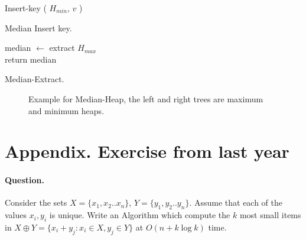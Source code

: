 \begin{algorithm}
 {
	 {
       Insert-key ( $H_{min}$, $v$ )
    }
}
\caption{Median Insert key.}
\end{algorithm}

\begin{algorithm}
median $\leftarrow$ extract $H_{max}$ \\   
return median 
\caption{Median-Extract.}
\end{algorithm}

\begin{figure}[h]
  \centering
  \begin{subfigure}[b]{0.49\textwidth}
	
  \end{subfigure}
\begin{subfigure}[b]{0.49\textwidth}
	
  \end{subfigure}
  \caption{ Example for Median-Heap, the left and right trees are maximum and minimum heaps.  }
\end{figure}


\section{ Appendix. Exercise from last year }

\paragraph{Question.} Consider the sets $X = \{x_1,x_2 .. x_n\}$, $Y = \{y_1, y_2 .. y_n\}$. Assume that each of the values $x_i,y_i$ is unique. Write an Algorithm which compute the $k$ most small items in $X \oplus Y = \{ x_{i} + y_{j} : x_{i} \in X , y_{j} \in Y  \} $ at $ O \left( n + k\log k  \right) $ time. 

